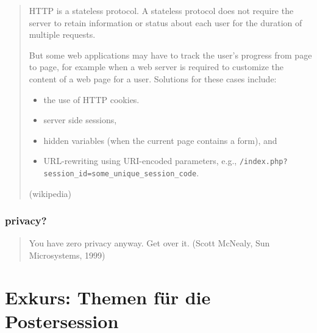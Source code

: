 \begin{frame}[fragile]
  \begin{quote}
    HTTP is a stateless protocol. A stateless protocol does not require the server to retain information or status about each user for the duration of multiple requests.

    But some web applications may have to track the user's progress from page to page, for example when a web server is required to customize the content of a web page for a user. Solutions for these cases include:
    \begin{itemize}
      \item the use of HTTP cookies.
      \item server side sessions,
      \item hidden variables (when the current page contains a form), and
      \item URL-rewriting using URI-encoded parameters, e.g., \lstinline{/index.php?session_id=some_unique_session_code}.
    \end{itemize}
    \hfill(wikipedia)
  \end{quote}
\end{frame}


\begin{frame}
\frametitle{privacy?}
  \begin{quote}
    You have zero privacy anyway. Get over it. \hfill(Scott McNealy, Sun Microsystems, 1999)
  \end{quote}
\end{frame}

\section{Exkurs: Themen für die Postersession}
  

